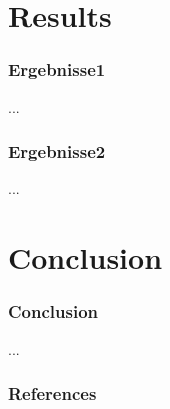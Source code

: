 \documentclass[student]{ITRslides}
\begin{document}
\section{Results}

\begin{frame}
	\frametitle{Ergebnisse1}
	...
\end{frame}

\begin{frame}
	\frametitle{Ergebnisse2}
	...
\end{frame}

\section{Conclusion}

\begin{frame}
	\frametitle{Conclusion}
	...
\end{frame}
\appendix
\begin{frame}
	\frametitle{References}
	\printbibliography
\end{frame}
\end{document}
